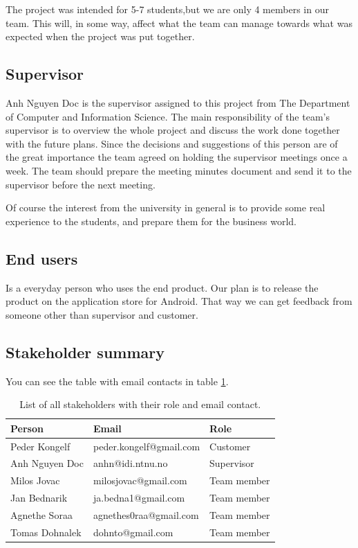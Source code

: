  The project was intended for 5-7 students,but we are only 4 members in our team. This will, in some way, affect what the team can manage towards what was expected when the project was put together.

\subsection{Supervisor}

Anh Nguyen Doc is the supervisor assigned to this project from The Department of Computer and Information Science. The main responsibility of the team's supervisor is to overview the whole project and discuss the work done together with the future plans. Since the decisions and suggestions of this person are of the great importance the team agreed on holding the supervisor meetings once a week. The team should prepare the meeting minutes document and send it to the supervisor before the next meeting.


Of course the interest from the university in general is to provide some real experience to the students, and prepare them for the business world.


\subsection{End users}
Is a everyday person who uses the end product. Our plan is to release the product on the application store for Android. That way we can get feedback from someone other than supervisor and customer. 
\subsection{Stakeholder summary}
You can see the table with email contacts in table \ref{tab:stakeholders_summary}.

\begin{table}[!ht]\centering
\caption{List of all stakeholders with their role and email contact. }
\label{tab:stakeholders_summary}
\def\arraystretch{1.15}
\begin{tabular}{lll}
\toprule[1mm]
\textbf{Person} & \textbf{Email} & \textbf{Role}\\
\midrule
Peder Kongelf & peder.kongelf@gmail.com  & Customer\\
\midrule
Anh Nguyen Doc	 & anhn@idi.ntnu.no & Supervisor \\
\midrule
Milos Jovac &  milosjovac@gmail.com & Team member  \\
Jan Bednarik &  ja.bedna1@gmail.com & Team member\\
Agnethe Soraa & agnethes0raa@gmail.com & Team member  \\
Tomas Dohnalek & dohnto@gmail.com & Team member \\
\bottomrule[1mm]

\end{tabular}
\end{table}